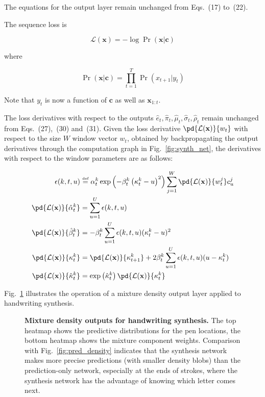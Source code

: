 The equations for the output layer remain unchanged from Eqs.~(17) to~(22).

The sequence loss is

\begin{equation}
\mathcal{L}(\mathbf{x}) = -\log \Pr(\mathbf{x}|\mathbf{c})
\end{equation}

where

\begin{equation}
\Pr(\mathbf{x}|\mathbf{c}) = \prod_{t=1}^{T}{\Pr\left(x_{t+1}|y_t\right)}
\end{equation}

Note that $y_t$ is now a function of $\mathbf{c}$ as well as $\mathbf{x}_{1:t}$.

The loss derivatives with respect to the outputs $\hat{e}_t, \hat{\pi}_t, \hat{\mu}_t, \hat{\sigma}_t, \hat{\rho}_t$ remain unchanged from Eqs.~(27),~(30) and~(31). Given the loss derivative $\pd{\mathcal{L}(\mathbf{x})}{w_t}$ with respect to the size $W$ window vector $w_t$, obtained by backpropagating the output derivatives through the computation graph in Fig.~\ref{fig:synth_net}, the derivatives with respect to the window parameters are as follows:

\begin{align}
\epsilon(k, t, u) &\mathrel{\stackrel{\text{\tiny{def}}}{=}}  {\alpha}^k_t\exp\left(-\beta_t^k\left(\kappa_t^k-u\right)^2\right) \sum_{j=1}^{W}{\pd{\mathcal{L}(\mathbf{x})}{w^j_t} c^j_u}\\
\pd{\mathcal{L}(\mathbf{x})}{\hat{\alpha}^k_t} &= \sum_{u=1}^U{\epsilon(k, t, u)}\\
\pd{\mathcal{L}(\mathbf{x})}{\hat{\beta}^k_t} &= -{\beta}^k_t \sum_{u=1}^U{\epsilon(k, t, u) (\kappa^k_t-u)^2}\\
\pd{\mathcal{L}(\mathbf{x})}{{\kappa}^k_t} &= \pd{\mathcal{L}(\mathbf{x})}{{\kappa}^k_{t+1}} + 2 \beta^k_t \sum_{u=1}^U{\epsilon(k, t, u) (u - \kappa^k_t)}\\
\pd{\mathcal{L}(\mathbf{x})}{\hat{\kappa}^k_t} &= \exp\left(\hat{\kappa}^k_t\right) \pd{\mathcal{L}(\mathbf{x})}{{\kappa}^k_t}
\end{align}

Fig.~\ref{fig:synth_density} illustrates the operation of a mixture density output layer applied to handwriting synthesis.

\begin{figure}
\begin{center}

\end{center}
\caption[Mixture density outputs for handwriting synthesis.]{\textbf{Mixture density outputs for handwriting synthesis.} The top heatmap shows the predictive distributions for the pen locations, the bottom heatmap shows the mixture component weights. Comparison with Fig.~\ref{fig:pred_density} indicates that the synthesis network makes more precise predictions (with smaller density blobs) than the prediction-only network, especially at the ends of strokes, where the synthesis network has the advantage of knowing which letter comes next.}
\label{fig:synth_density}
\end{figure}

